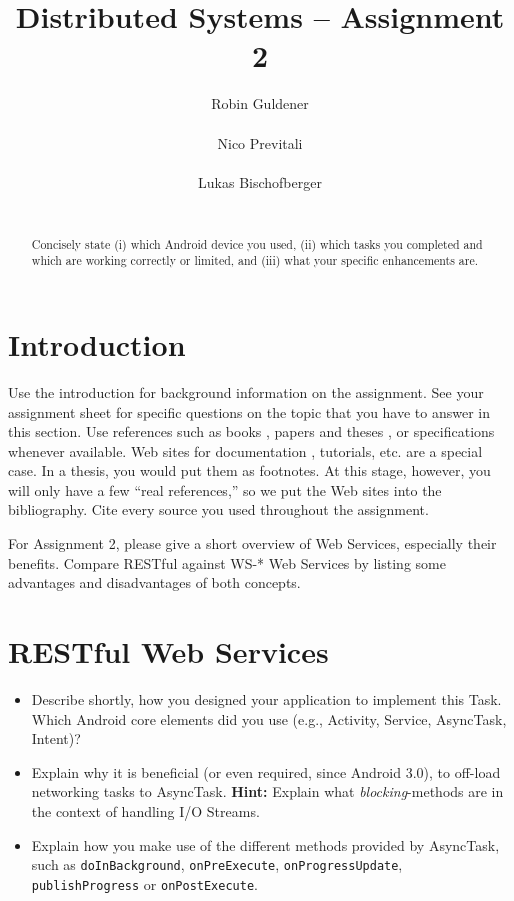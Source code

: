 \documentclass{report}
\title{Distributed Systems -- Assignment 2}
\author{
%
%
\alignauthor Robin Guldener\\
	\affaddr{ETH ID 11-930-369}\\
	\email{robing@student.ethz.ch}
\alignauthor Nico Previtali\\
	\affaddr{ETH ID 11-926-433}\\
	\email{pnico@student.ethz.ch}
\alignauthor Lukas Bischofberger\\
	\affaddr{ETH ID 11-915-907}\\
	\email{lukasbi@student.ethz.ch}
}
\begin{document}
\maketitle

\begin{abstract}
Concisely state (i) which Android device you used, (ii) which tasks you completed and which are working correctly or limited, and (iii) what your specific enhancements are.
\end{abstract}

\section{Introduction}

Use the introduction for background information on the assignment.
See your assignment sheet for specific questions on the topic that you have to answer in this section.
Use references such as books \cite{hello}, papers and theses \cite{REST}, or specifications \cite{RFC2616} whenever available.
Web sites for documentation \cite{devServices}, tutorials, etc. are a special case.
In a thesis, you would put them as footnotes. At this stage, however, you will only have a few ``real references,'' so we put the Web sites into the bibliography.
Cite every source you used throughout the assignment.

For Assignment 2, please give a short overview of Web Services, especially their benefits.
Compare RESTful against WS\hbox{-}* Web Services by listing some advantages and disadvantages of both concepts.

\section{RESTful Web Services}
\begin{itemize}
	\item Describe shortly, how you designed your application to implement this Task. Which Android core elements did you use (e.g., Activity, Service, AsyncTask, Intent)?
	\item Explain why it is beneficial (or even required, since Android 3.0), to off-load networking tasks to AsyncTask. \textbf{Hint:} Explain what \emph{blocking}-methods are in the context of handling I/O Streams.
	\item Explain how you make use of the different methods provided by AsyncTask, such as \texttt{doInBackground}, \texttt{onPreExecute}, \texttt{onProgressUpdate}, \texttt{publishProgress} or \texttt{onPostExecute}.
\end{itemize}
\end{document}
